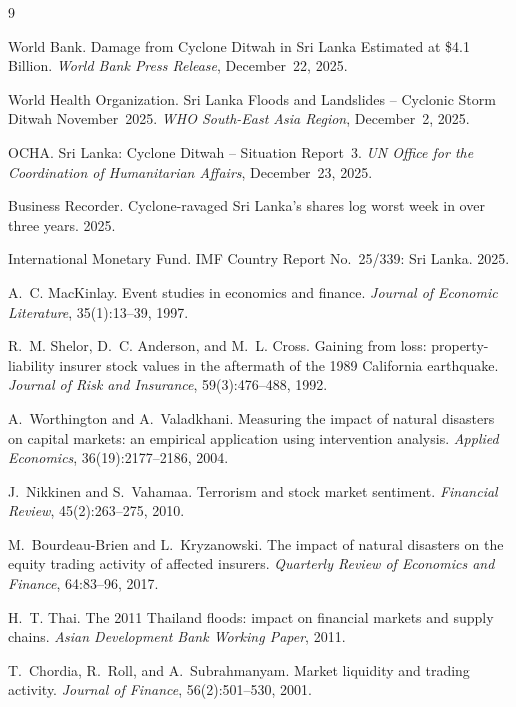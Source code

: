\documentclass[sigconf, nonacm]{acmart}
\begin{document}
\begin{thebibliography}{9}

World Bank.
\newblock Damage from Cyclone Ditwah in Sri Lanka Estimated at \$4.1 Billion.
\newblock \textit{World Bank Press Release}, December~22, 2025.

World Health Organization.
\newblock Sri Lanka Floods and Landslides -- Cyclonic Storm Ditwah
  November~2025.
\newblock \textit{WHO South-East Asia Region}, December~2, 2025.

OCHA.
\newblock Sri Lanka: Cyclone Ditwah -- Situation Report~3.
\newblock \textit{UN Office for the Coordination of Humanitarian Affairs},
  December~23, 2025.

Business Recorder.
\newblock Cyclone-ravaged Sri Lanka's shares log worst week in over three
  years. 2025.

International Monetary Fund.
\newblock IMF Country Report No.\ 25/339: Sri Lanka. 2025.

A.~C. MacKinlay.
\newblock Event studies in economics and finance.
\newblock \textit{Journal of Economic Literature}, 35(1):13--39, 1997.

R.~M. Shelor, D.~C. Anderson, and M.~L. Cross.
\newblock Gaining from loss: property-liability insurer stock values in the
  aftermath of the 1989 California earthquake.
\newblock \textit{Journal of Risk and Insurance}, 59(3):476--488, 1992.

A.~Worthington and A.~Valadkhani.
\newblock Measuring the impact of natural disasters on capital markets: an
  empirical application using intervention analysis.
\newblock \textit{Applied Economics}, 36(19):2177--2186, 2004.

J.~Nikkinen and S.~Vahamaa.
\newblock Terrorism and stock market sentiment.
\newblock \textit{Financial Review}, 45(2):263--275, 2010.

M.~Bourdeau-Brien and L.~Kryzanowski.
\newblock The impact of natural disasters on the equity trading activity of
  affected insurers.
\newblock \textit{Quarterly Review of Economics and Finance}, 64:83--96, 2017.

H.~T. Thai.
\newblock The 2011 Thailand floods: impact on financial markets and supply
  chains.
\newblock \textit{Asian Development Bank Working Paper}, 2011.

T.~Chordia, R.~Roll, and A.~Subrahmanyam.
\newblock Market liquidity and trading activity.
\newblock \textit{Journal of Finance}, 56(2):501--530, 2001.

\end{thebibliography}
\end{document}

